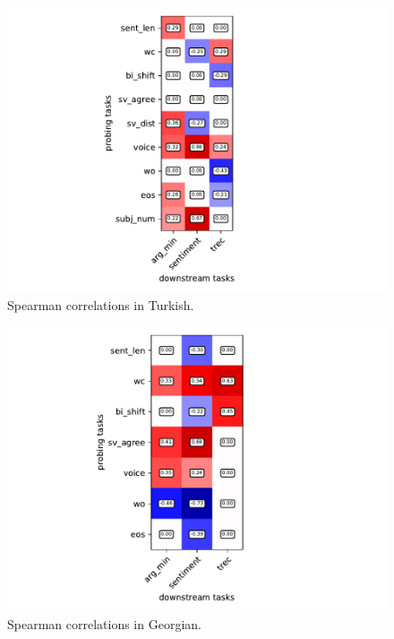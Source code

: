 \begin{minipage}{0.49\textwidth}
	\begin{figure}[H]
		\centering
		\includegraphics[scale=0.675]{images/spearman_corr_tr_f1}
		\caption[Spearman correlations between probing and downstream task performances in Turkish (F1 scores)]
			{Spearman correlations in Turkish.}
		\label{fig:correlations_probing_downstream_tr}
	\end{figure}
\end{minipage}
\hfill
\begin{minipage}{0.49\textwidth}
	\begin{figure}[H]
		\centering
		\includegraphics[scale=0.675]{images/spearman_corr_ka_f1}
		\caption[Spearman correlations between probing and downstream task performances in Georgian (F1 scores)]
			{Spearman correlations in Georgian.}
		\label{fig:correlations_probing_downstream_ka}
	\end{figure}
\end{minipage}


